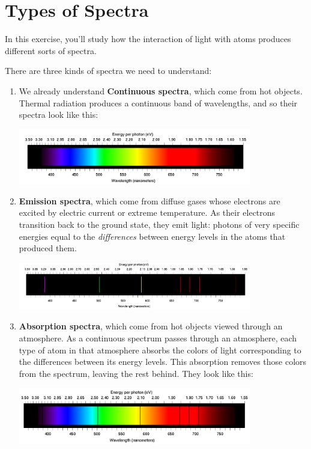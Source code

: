 \documentclass[12pt]{article}
\newcommand{\BC}{\begin{center}}
\newcommand{\EC}{\end{center}}
\begin{document}
\Large
\centerline{}

\normalsize

\section{Types of Spectra}

In this exercise, you'll study how the interaction of light with atoms produces different sorts of spectra.

There are three kinds of spectra we need to understand:

\begin{enumerate}
	\item We already understand {\bf Continuous spectra}, which come from hot objects. Thermal radiation produces a continuous band of wavelengths, and so their spectra look like this:
	\BC
	\includegraphics[width=4in]{spectrum-continuous.png}
	\EC
	
	
	
	
	\item {\bf Emission spectra}, which come from diffuse gases whose electrons are excited by electric current or extreme temperature. As their electrons transition back to the ground state, they emit light: photons of very specific energies equal to the {\it differences} between energy levels in the atoms that produced them.
	
	\BC
		\includegraphics[width=4in]{spectrum-discrete.png}
	\EC
	\item {\bf Absorption spectra}, which come from hot objects viewed through an atmosphere. As a continuous spectrum passes through an atmosphere, each type of atom in that atmosphere absorbs the colors of light corresponding to the differences between its energy levels. This absorption removes those colors from the spectrum, leaving the rest behind. They look like this:
	\BC
	\includegraphics[width=4in]{spectrum-absorption.png}
	\EC
	
\end{enumerate}
\end{document}
